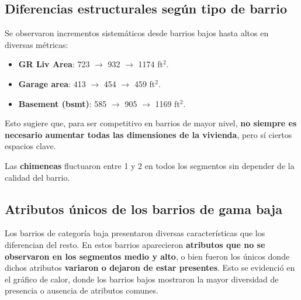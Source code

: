 \subsection{Diferencias estructurales según tipo de barrio}

Se observaron incrementos sistemáticos desde barrios bajos hasta altos en diversas métricas:

\begin{itemize}
    \item \textbf{GR Liv Area}: 723 $\rightarrow$ 932 $\rightarrow$ 1174 ft$^2$.
    \item \textbf{Garage area}: 413 $\rightarrow$ 454 $\rightarrow$ 459 ft$^2$.
    \item \textbf{Basement (bsmt)}: 585 $\rightarrow$ 905 $\rightarrow$ 1169 ft$^2$.
\end{itemize}

Esto sugiere que, para ser competitivo en barrios de mayor nivel, \textbf{no siempre es necesario aumentar todas las dimensiones de la vivienda}, pero sí ciertos espacios clave.

Las \textbf{chimeneas} fluctuaron entre 1 y 2 en todos los segmentos sin depender de la calidad del barrio.

\subsection{Atributos únicos de los barrios de gama baja}

Los barrios de categoría baja presentaron diversas características que los diferencian del resto. En estos barrios aparecieron \textbf{atributos que no se observaron en los segmentos medio y alto}, o bien fueron los únicos donde dichos atributos \textbf{variaron o dejaron de estar presentes}. Esto se evidenció en el gráfico de calor, donde los barrios bajos mostraron la mayor diversidad de presencia o ausencia de atributos comunes.
